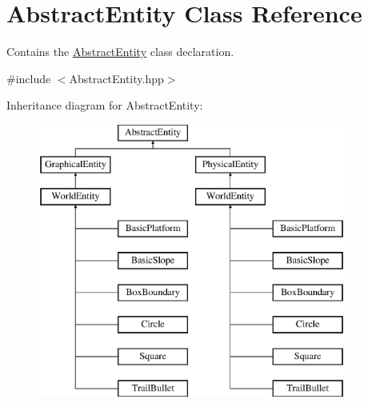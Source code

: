 \hypertarget{class_abstract_entity}{}\section{Abstract\+Entity Class Reference}
\label{class_abstract_entity}


Contains the \hyperlink{class_abstract_entity}{Abstract\+Entity} class declaration.  




{\ttfamily \#include $<$Abstract\+Entity.\+hpp$>$}

Inheritance diagram for Abstract\+Entity\+:\begin{figure}[H]
\begin{center}
\leavevmode
\includegraphics[height=9.000000cm]{class_abstract_entity}
\end{center}
\end{figure}
